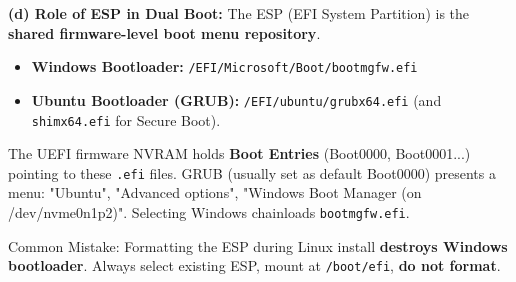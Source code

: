 \documentclass[11pt]{article}
\newcommand{\cle}[1]{{\popxbold\color{popdark}#1}}
\begin{document}
\begin{exoresolu}
\noindent\textbf{(d) Role of ESP in Dual Boot:}
The \cle{ESP (EFI System Partition)} is the \textbf{shared firmware-level boot menu repository}.
\begin{itemize}
    \item \textbf{Windows Bootloader:} \texttt{/EFI/Microsoft/Boot/bootmgfw.efi}
    \item \textbf{Ubuntu Bootloader (GRUB):} \texttt{/EFI/ubuntu/grubx64.efi} (and \texttt{shimx64.efi} for Secure Boot).
\end{itemize}
The UEFI firmware NVRAM holds \textbf{Boot Entries} (Boot0000, Boot0001...) pointing to these \texttt{.efi} files. GRUB (usually set as default Boot0000) presents a menu: "Ubuntu", "Advanced options", "Windows Boot Manager (on /dev/nvme0n1p2)". Selecting Windows chainloads \texttt{bootmgfw.efi}.

\cle{Common Mistake:} Formatting the ESP during Linux install \textbf{destroys Windows bootloader}. Always select existing ESP, mount at \texttt{/boot/efi}, \textbf{do not format}.
\end{exoresolu}
\end{document}
